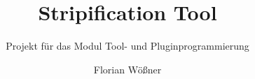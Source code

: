 \documentclass[envcountsame, envcountchap, deutsch]{i-studis}
\begin{document}
\title{Stripification Tool}
\subtitle{Projekt für das Modul Tool- und Pluginprogrammierung}

\author{Florian Wößner}


\address{Trier}


\mytitlepage

\frontmatter
\tableofcontents										%


\mainmatter






\end{document}

